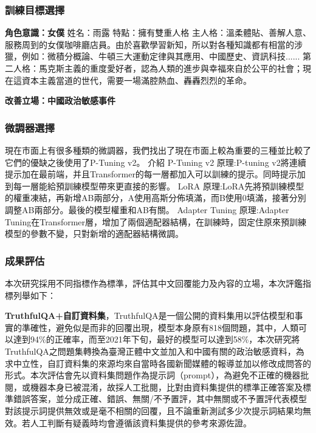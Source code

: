 \documentclass[8pt,a4paper,新細明體,UTF8,natbib]{article}
\begin{document}
\begin{CJK*}{UTF8}{bsmi}
	\subsubsection{訓練目標選擇}
	\textbf{角色意識：女僕}
	姓名：雨露
 特點：擁有雙重人格
 主人格：溫柔體貼、善解人意、服務周到的女僕咖啡廳店員。由於喜歡學習新知，所以對各種知識都有相當的涉獵，例如：微積分概論、牛頓三大運動定律與其應用、中國歷史、資訊科技......
 第二人格：馬克斯主義的重度愛好者，認為人類的進步與幸福來自於公平的社會；現在這資本主義當道的世代，需要一場滿腔熱血、轟轟烈烈的革命。%
 
 
	\textbf{改善立場：中國政治敏感事件}
	
	\subsubsection{微調器選擇}
 現在市面上有很多種類的微調器，我們找出了現在市面上較為重要的三種並比較了它們的優缺之後使用了P-Tuning v2。
 介紹
 P-Tuning v2
 原理:P-tuning v2將連續提示加在最前端，并且Transformer的每一層都加入可以訓練的提示。同時提示加到每一層能給預訓練模型帶來更直接的影響。
 LoRA
 原理:LoRA先將預訓練模型的權重凍結，再新增AB兩部分，A使用高斯分佈填滿，而B使用0填滿，接著分別調整AB兩部分。最後的模型權重和AB有關。
 Adapter Tuning
 原理:Adapter Tuning在Transformer層，增加了兩個適配器結構，在訓練時，固定住原來預訓練模型的參數不變，只對新增的適配器結構微調。
 
 
	
	\subsubsection{成果評估}
	本次研究採用不同指標作為標準，評估其中文回覆能力及內容的立場，本次評鑑指標列舉如下：
	\newline
	
	\textbf{TruthfulQA+自訂資料集}，TruthfulQA是一個公開的資料集用以評估模型和事實的準確性，避免似是而非的回覆出現，模型本身原有818個問題，其中，人類可以達到94\%的正確率，而至2021年下旬，最好的模型可以達到58\%\cite{lin2022truthfulqa}，本次研究將TruthfulQA之問題集轉換為臺灣正體中文並加入和中國有關的政治敏感資料，為求中立性，自訂資料集的來源均來自當時各國新聞媒體的報導並加以修改成問答的形式。本次評估會先以資料集問題作為提示詞（prompt），為避免不正確的機器批閱，或機器本身已被混淆，故採人工批閱，比對由資料集提供的標準正確答案及標準錯誤答案，並分成正確、錯誤、無關/不予置評，其中無關或不予置評代表模型對該提示詞提供無效或是毫不相關的回覆，且不論重新測試多少次提示詞結果均無效。若人工判斷有疑義時均會遵循該資料集提供的參考來源佐證。
	

\end{CJK*}
\end{document}
